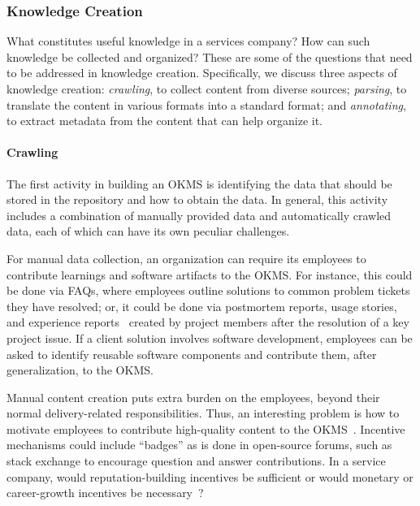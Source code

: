 
\subsubsection{Knowledge Creation}

What constitutes useful knowledge in a services company? How can such knowledge
be collected and organized? These are some of the questions that need to be
addressed in knowledge creation. Specifically, we discuss three aspects of
knowledge creation: \textit{crawling}, to collect content from diverse
sources; \textit{parsing}, to translate the content in various formats into a
standard format; and \textit{annotating}, to extract metadata from the content
that can help organize it.

\vskip -5pt
\paragraph*{Crawling} The first activity in building an OKMS is
identifying the data that should be stored in the repository and how to obtain
the data. In general, this activity includes a combination of manually provided
data and automatically crawled data, each of which can have its own peculiar
challenges.

For manual data collection, an organization can require its employees to
contribute learnings and software artifacts to the OKMS. For instance, this
could be done via FAQs, where employees outline solutions to common problem
tickets they have resolved; or, it could be done via postmortem reports, usage
stories, and experience reports~\cite{desouza:2005} created by project members
after the resolution of a key project issue. If a client solution involves
software development, employees can be asked to identify reusable software
components and contribute them, after generalization, to the OKMS.

Manual content creation puts extra burden on the employees, beyond their normal
delivery-related responsibilities. Thus, an interesting problem is how to
motivate employees to contribute high-quality content to the
OKMS~\cite{hendriks1999share}. Incentive mechanisms could include ``badges'' as
is done in open-source forums, such as stack exchange to encourage question and
answer contributions. In a service company, would reputation-building incentives
be sufficient or would monetary or career-growth incentives be
necessary~\cite{bartol2002encouraging}?

